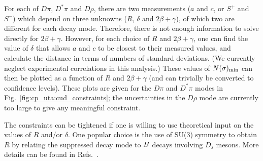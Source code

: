 For each of $D\pi$, $D^*\pi$ and $D\rho$, 
there are two measurements ($a$ and $c$, or $S^+$ and $S^-$) 
which depend on three unknowns ($R$, $\delta$ and $2\beta+\gamma$), 
of which two are different for each decay mode. 
Therefore, there is not enough information to solve directly for $2\beta+\gamma$. 
However, for each choice of $R$ and $2\beta+\gamma$, 
one can find the value of $\delta$ that allows $a$ and $c$ to be closest 
to their measured values, 
and calculate the distance in terms of numbers of standard deviations.
(We currently neglect experimental correlations in this analysis.) 
These values of $N(\sigma)_{\rm min}$ can then be plotted 
as a function of $R$ and $2\beta+\gamma$
(and can trivially be converted to confidence levels). 
These plots are given for the $D\pi$ and $D^*\pi$ modes 
in Fig.~\ref{fig:cp_uta:cud_constraints}; 
the uncertainties in the $D\rho$ mode are currently too large 
to give any meaningful constraint.

The constraints can be tightened if one is willing 
to use theoretical input on the values of $R$ and/or $\delta$. 
One popular choice is the use of SU(3) symmetry to obtain 
$R$ by relating the suppressed decay mode to $B$ decays 
involving $D_s$ mesons. 
More details can be found 
in Refs.~\cite{Charles:2004jd,Bona:2005vz}.


